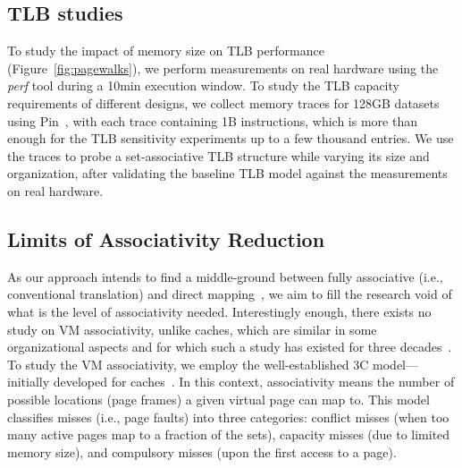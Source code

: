 \subsection{TLB studies}
To study the impact of memory size on  TLB performance (Figure~\ref{fig:pagewalks}), we perform measurements on real hardware using the \textit{perf} tool during a 10min execution window. To study the TLB capacity requirements of different designs, we collect memory traces for 128GB datasets using Pin~\cite{luk:pin}, with each trace containing 1B instructions, which is more than enough for the TLB sensitivity experiments up to a few thousand entries. We use the traces to probe a set-associative TLB structure while varying its size and organization, after validating the baseline TLB model against the measurements on real hardware. 

\subsection{Limits of Associativity Reduction}


As our approach intends to find a middle-ground between fully associative (i.e., conventional translation) and direct mapping~\cite{picorel:near-memory, haria:devirtualizing}, we aim to fill the research void of what is the level of associativity needed. Interestingly enough, there exists no study on VM associativity, unlike caches, which are similar in some organizational aspects and for which such a study has existed for three decades~\cite{hill:aspects}. To study the VM associativity, we employ the well-established 3C model---initially developed for caches~\cite{hill:aspects}. In this context, associativity means the number of possible locations (page frames) a given virtual page can map to. This model classifies misses (i.e., page faults) into three categories: conflict misses (when too many active pages map to a fraction of the sets), capacity misses (due to limited memory size), and compulsory misses (upon the first access to a page). 


